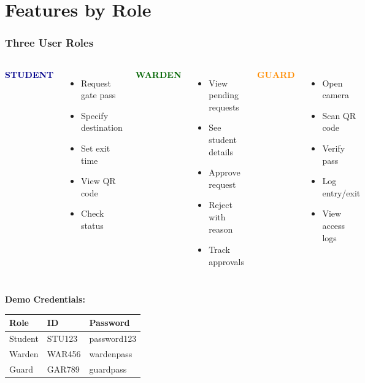 \documentclass[11pt]{beamer}
\begin{document}
\section{Features by Role}

\begin{frame}
\frametitle{Three User Roles}
\begin{columns}[T]
\textbf{\textcolor{darkblue}{STUDENT}}
\begin{itemize}
    \item Request gate pass
    \item Specify destination
    \item Set exit time
    \item View QR code
    \item Check status
\end{itemize}

\textbf{\textcolor{darkgreen}{WARDEN}}
\begin{itemize}
    \item View pending requests
    \item See student details
    \item Approve request
    \item Reject with reason
    \item Track approvals
\end{itemize}

\textbf{\textcolor{darkorange}{GUARD}}
\begin{itemize}
    \item Open camera
    \item Scan QR code
    \item Verify pass
    \item Log entry/exit
    \item View access logs
\end{itemize}
\end{columns}

\vspace{1cm}
\textbf{Demo Credentials:}
\begin{center}
\begin{tabular}{|l|l|l|}
\hline
\textbf{Role} & \textbf{ID} & \textbf{Password} \\
\hline
Student & STU123 & password123 \\
Warden & WAR456 & wardenpass \\
Guard & GAR789 & guardpass \\
\hline
\end{tabular}
\end{center}
\end{frame}
\end{document}
